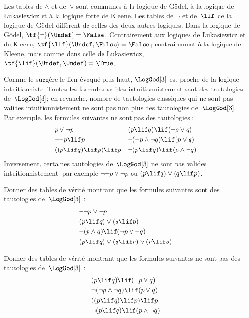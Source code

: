 \documentclass[../../../include/open-logic-section]{subfiles}
\begin{document}
Les tables de $\land$ et de~$\lor$ sont communes à la logique
de G\"odel, à la logique de \L ukasiewicz et à la logique forte de
Kleene. Les tables de $\lnot$ et de~$\lif$ de la logique de
G\"odel diffèrent de celles des deux autres logiques.
Dans la logique de G\"odel,
$\tf{\lnot}(\Undef)=\False$.
Contrairement aux logiques de
\L ukasiewicz et de Kleene,
$\tf{\lif}(\Undef,\False)=\False$;
contrairement à la logique de Kleene,
mais comme dans celle de \L ukasiewicz,
$\tf{\lif}(\Undef,\Undef)=\True$.

Comme le suggère le lien évoqué plus
haut, $\LogGod[3]$ est proche de la
logique intuitionniste. Toutes les
formules valides intuitionnistement
sont des tautologies de~$\LogGod[3]$;
en revanche, nombre de tautologies
classiques qui ne sont pas valides
intuitionnistement ne sont pas non
plus des tautologies de~$\LogGod[3]$.
Par exemple, les formules suivantes
ne sont pas des tautologies :
\begin{align*}
  & p\lor\lnot p && (p\lif q)\lif(\lnot p\lor q) \\
  & \lnot\lnot p\lif p && \lnot(\lnot p\land\lnot q)\lif(p\lor q) \\
  & ((p\lif q)\lif p)\lif p && \lnot(p\lif q)\lif(p\land\lnot q)
\end{align*}
Inversement, certaines tautologies
de~$\LogGod[3]$ ne sont pas valides
intuitionnistement, par exemple
$\lnot\lnot p\lor\lnot p$ ou
$(p\lif q)\lor(q\lif p)$.

\begin{prob}
  Donner des tables de vérité montrant
  que les formules suivantes sont des
  tautologies de~$\LogGod[3]$ :
  \begin{align*}
    & \lnot\lnot p\lor\lnot p \\
    & (p\lif q)\lor(q\lif p) \\
    & \lnot(p\land q)\lif(\lnot p\lor\lnot q) \\
    & (p\lif q)\lor(q\lif r)\lor(r\lif s)
  \end{align*}
\end{prob}

\begin{prob}
  Donner des tables de vérité montrant
  que les formules suivantes ne sont
  pas des tautologies de~$\LogGod[3]$ :
  \begin{align*}
    & (p\lif q)\lif(\lnot p\lor q) \\
    & \lnot(\lnot p\land\lnot q)\lif(p\lor q) \\
    & ((p\lif q)\lif p)\lif p \\
    & \lnot(p\lif q)\lif(p\land\lnot q)
  \end{align*}
\end{prob}
\end{document}
